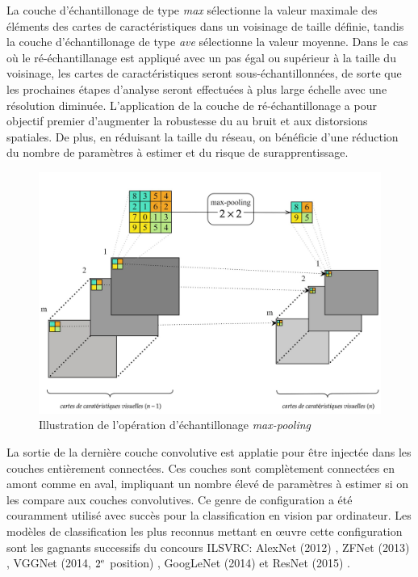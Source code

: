 La couche d'échantillonage de type \textit{max} sélectionne la valeur maximale des éléments des cartes de caractéristiques dans un voisinage de taille définie, tandis la couche d'échantillonage de type \textit{ave} sélectionne la valeur moyenne.  Dans le cas où le ré-échantillanage est appliqué avec un pas égal ou supérieur à la taille du voisinage, les cartes de caractéristiques seront sous-échantillonnées, de sorte que les prochaines étapes d’analyse seront effectuées à plus large échelle avec une résolution diminuée.  L’application de la couche de ré-échantillonage a pour objectif premier d’augmenter la robustesse du \acrconvnet au bruit et  aux distorsions spatiales.  De plus, en réduisant la taille du réseau, on bénéficie d’une réduction du nombre de paramètres à estimer et du risque de surapprentissage.

\begin{figure}[!htbp] 
  \includegraphics[width=0.75 \linewidth]{figures/Chap2/max-pooling-diagram.jpg}
   \centering
\caption
{\small Illustration de l'opération d'échantillonage \textit{max-pooling}}
  \label{fig:max-pooling-diagram}
\end{figure}

La sortie de la dernière couche convolutive est applatie pour être injectée dans les couches entièrement connectées. Ces couches sont complètement connectées en amont comme en aval, impliquant un nombre élevé de paramètres à estimer si on les compare aux couches convolutives. Ce genre de configuration a été couramment utilisé avec succès pour la classification en vision par ordinateur. Les modèles de classification les plus reconnus mettant en œuvre cette configuration sont les gagnants successifs du concours ILSVRC: AlexNet (2012) \cite{Krizhevsky2012}, ZFNet (2013) \cite{ZFNet}, VGGNet (2014, $2\textsuperscript{e}$ position)  \cite{vgg}, GoogLeNet (2014) \cite{Szegedy2015} et ResNet (2015) \cite{He2015DelvingDI}.

